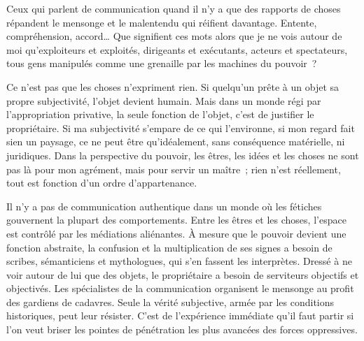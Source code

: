 \documentclass[french,twoside]{book} %
\newcommand{\astermono}{\medskip\centerline{\color{rubric}\large\selectfont{\syms ✻}}\medskip\par}%
\begin{document}
\astermono

\noindent Ceux qui parlent de communication quand il n’y a que des rapports de choses répandent le mensonge et le malentendu qui réifient davantage. Entente, compréhension, accord… Que signifient ces mots alors que je ne vois autour de moi qu’exploiteurs et exploités, dirigeants et exécutants, acteurs et spectateurs, tous gens manipulés comme une grenaille par les machines du pouvoir ?\par
Ce n’est pas que les choses n’expriment rien. Si quelqu’un prête à un objet sa propre subjectivité, l’objet devient humain. Mais dans un monde régi par l’appropriation privative, la seule fonction de l’objet, c’est de justifier le propriétaire. Si ma subjectivité s’empare de ce qui l’environne, si mon regard fait sien un paysage, ce ne peut être qu’idéalement, sans conséquence matérielle, ni juridiques. Dans la perspective du pouvoir, les êtres, les idées et les choses ne sont pas là pour mon agrément, mais pour servir un maître ; rien n’est réellement, tout est fonction d’un ordre d’appartenance.\par
Il n’y a pas de communication authentique dans un monde où les fétiches gouvernent la plupart des comportements. Entre les êtres et les choses, l’espace est contrôlé par les médiations aliénantes. À mesure que le pouvoir devient une fonction abstraite, la confusion et la multiplication de ses signes a besoin de scribes, sémanticiens et mythologues, qui s’en fassent les interprètes. Dressé à ne voir autour de lui que des objets, le propriétaire a besoin de serviteurs objectifs et objectivés. Les spécialistes de la communication organisent le mensonge au profit des gardiens de cadavres. Seule la vérité subjective, armée par les conditions historiques, peut leur résister. C’est de l’expérience immédiate qu’il faut partir si l’on veut briser les pointes de pénétration les plus avancées des forces oppressives.\par

\astermono
\end{document}
